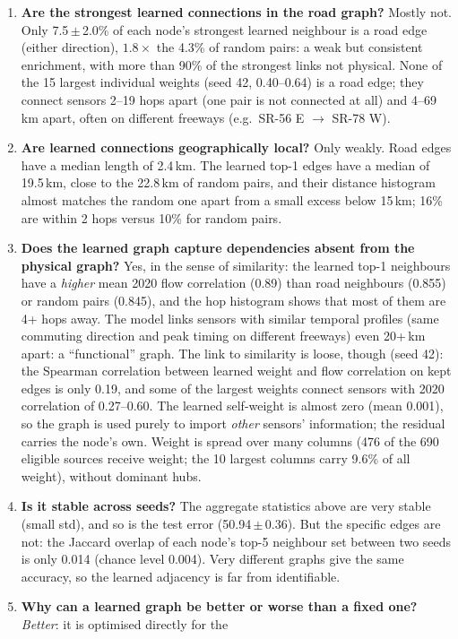 \documentclass[11pt,a4paper]{article}
\newcommand{\sd}[2]{#1{\scriptsize\,$\scriptstyle\pm$\,#2}}
\begin{document}
\begin{enumerate}
\item \textbf{Are the strongest learned connections in the road graph?} Mostly not. Only \sd{7.5}{2.0}\% of each node's
strongest learned neighbour is a road edge (either direction), $1.8\times$ the 4.3\% of random pairs: a weak but consistent
enrichment, with more than 90\% of the strongest links not physical. None of the 15 largest individual weights (seed 42,
0.40--0.64) is a road edge; they connect sensors 2--19 hops apart (one pair is not connected at all) and 4--69\,km apart,
often on different freeways (e.g.\ SR-56 E $\to$ SR-78 W).
\item \textbf{Are learned connections geographically local?} Only weakly. Road edges have a median length of 2.4\,km. The
learned top-1 edges have a median of 19.5\,km, close to the 22.8\,km of random pairs, and their distance histogram almost matches
the random one apart from a small excess below 15\,km; 16\% are within 2 hops versus 10\% for random pairs.
\item \textbf{Does the learned graph capture dependencies absent from the physical graph?} Yes, in the sense of similarity:
the learned top-1 neighbours have a \emph{higher} mean 2020 flow correlation (0.89) than road neighbours (0.855) or random pairs
(0.845), and the hop histogram shows that most of them are 4+ hops away. The model links sensors with similar temporal profiles
(same commuting direction and peak timing on different freeways) even 20+\,km apart: a ``functional'' graph. The link to
similarity is loose, though (seed 42): the Spearman correlation between learned weight and flow correlation on kept edges is only 0.19,
and some of the largest weights connect sensors with 2020 correlation of 0.27--0.60. The learned self-weight is almost zero
(mean 0.001), so the graph is used purely to import \emph{other} sensors' information; the residual carries the node's own.
Weight is spread over many columns (476 of the 690 eligible sources receive weight; the 10 largest columns carry 9.6\% of all
weight), without dominant hubs.
\item \textbf{Is it stable across seeds?} The aggregate statistics above are very stable (small std), and so is the test error
(\sd{50.94}{0.36}). But the specific edges are not: the Jaccard overlap of each node's top-5 neighbour set between two seeds is
only 0.014 (chance level 0.004). Very different graphs give the same accuracy, so the learned adjacency is far from identifiable.
\item \textbf{Why can a learned graph be better or worse than a fixed one?} \emph{Better}: it is optimised directly for the

\end{enumerate}
\end{document}
